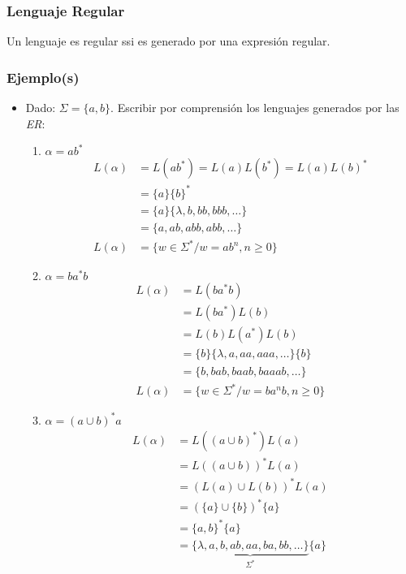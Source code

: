 \subsubsection*{Lenguaje Regular}
Un lenguaje es regular ssi es generado por una expresión regular.
\subsubsection*{Ejemplo(s)}

\begin{itemize}
\item Dado: $\Sigma = \{ a,b \}$. Escribir por comprensión los lenguajes generados por las \textit{ER}:
\begin{enumerate}[label=\alph*)]
\item $\alpha = ab^*$
	\begin{align*}
		L(\alpha ) & = L(ab^* )=L(a)L(b^*) = L(a)L(b)^* \\
			     & = \{ a \} \{ b \}^* \\
			     & = \{ a \} \{ \lambda, b,bb,bbb,\ldots \} \\
			     & = \{ a,ab,abb,abb,\ldots\} \\
		L(\alpha ) & = \{ w\in\Sigma^* / w=ab^n , n\geq 0  \}
	\end{align*}
\item $\alpha = ba^* b$
	\begin{align*}
		L(\alpha ) & = L(ba^*b)\\
			     & = L(ba^* ) L(b) \\
			     & = L(b )L(a^*) L(b) \\
			     & = \{ b \} \{ \lambda ,a,aa,aaa,\ldots\} \{ b\} \\
			     & = \{ b,bab,baab,baaab,\ldots \} \\
		L(\alpha ) & = \{ w\in\Sigma^* / w=ba^n b, n\geq 0 \} 
	\end{align*}
\item $\alpha = (a \cup b )^* a$
	\begin{align*}
		L(\alpha ) & = L( (a\cup b)^* ) L(a)\\
			     & = L( (a\cup b) )^* L(a)\\
			     & = (L(a) \cup L(b))^* L(a)\\
			     & = (\{ a \}\cup \{ b \})^* \{ a \} \\
			     & = \{ a,b \}^* \{ a \} \\ 
			 & = \underbrace{ \{ \lambda ,a,b,ab,aa,ba,bb,\ldots\}}_{\Sigma^*} \{ a\}\\

\end{align*}
\end{enumerate}
\end{itemize}
